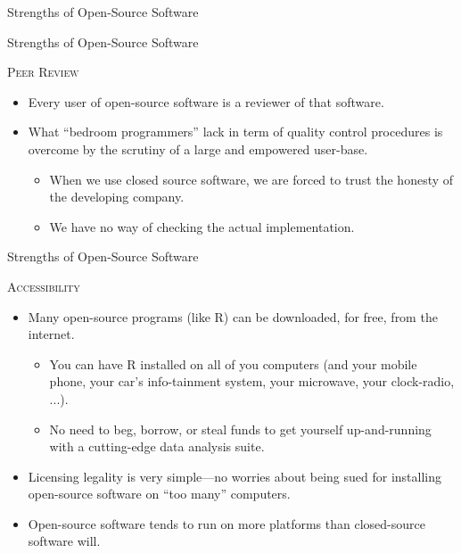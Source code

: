 \documentclass[10pt]{beamer}
\newcommand{\rmsc}[1]{\textrm{\textsc{#1}}}
\begin{document}
{\begin{frame}{Strengths of Open-Source Software}
\end{frame}


\begin{frame}{Strengths of Open-Source Software}

  \rmsc{Peer Review}
  \vb
  \begin{itemize}
  \item Every user of open-source software is a reviewer of that software.
    \vb
  \item What ``bedroom programmers'' lack in term of quality control procedures 
    is overcome by the scrutiny of a large and empowered user-base.
    \vc
    \begin{itemize}
    \item When we use closed source software, we are forced to trust the honesty 
      of the developing company.
      \vb
    \item We have no way of checking the actual implementation.
    \end{itemize}
  \end{itemize}

\end{frame}


\begin{frame}{Strengths of Open-Source Software}

  \rmsc{Accessibility}
  \vb
  \begin{itemize}
  \item Many open-source programs (like R) can be downloaded, for free, from the 
    internet.
    \begin{itemize}
      \vb
    \item You can have R installed on all of you computers (and your mobile 
      phone, your car's info-tainment system, your microwave, your clock-radio,
      ...).
      \vb
    \item No need to beg, borrow, or steal funds to get yourself up-and-running 
      with a cutting-edge data analysis suite.
    \end{itemize}
    \vb
  \item Licensing legality is very simple---no worries about being sued for 
    installing open-source software on ``too many'' computers.
    \vb
  \item Open-source software tends to run on more platforms than closed-source 
    software will.
  \end{itemize}


\end{frame}}
\end{document}
